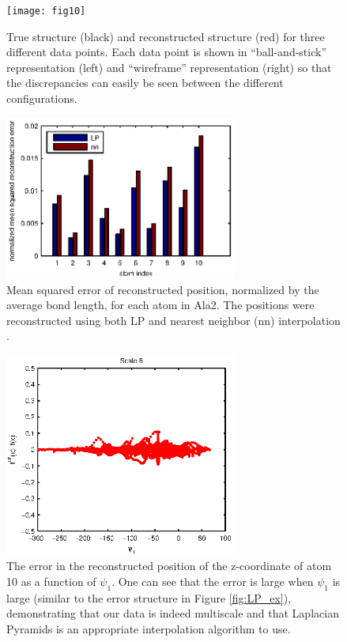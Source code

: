 \begin{figure}[t]
    \centering
    \texttt{[image: fig10]}
    \caption[Sample reconstructed alanine dipeptide configurations]{True structure (black) and reconstructed structure (red) for three different data points. Each data point is shown in ``ball-and-stick'' representation (left) and ``wireframe'' representation (right) so that the discrepancies can easily be seen between the different configurations.}
    \label{fig:ala_molecules}
\end{figure}

\begin{figure}[t]
	\centering
    \includegraphics[width=3in]{fig11}
    \caption[Average error in reconstructed alanine dipeptide configurations]{Mean squared error of reconstructed position, normalized by the average bond length, for each atom in Ala2.
    The positions were reconstructed using both LP and nearest neighbor (nn) interpolation .}
    \label{fig:ala_mse}
\end{figure}

\begin{figure}[t]
    \centering
    \includegraphics[width=3in]{fig10b}
    \caption[Error in reconstructed alanine dipeptide configurations]{The error in the reconstructed position of the z-coordinate of atom 10 as a function of $\psi_1$. One can see that the error is large when $\psi_1$ is large (similar to the error structure in Figure \ref{fig:LP_ex}), demonstrating that our data is indeed multiscale and that Laplacian Pyramids is an appropriate interpolation algorithm to use.}
    \label{fig:LapPyr_ala2_errors}
\end{figure}

